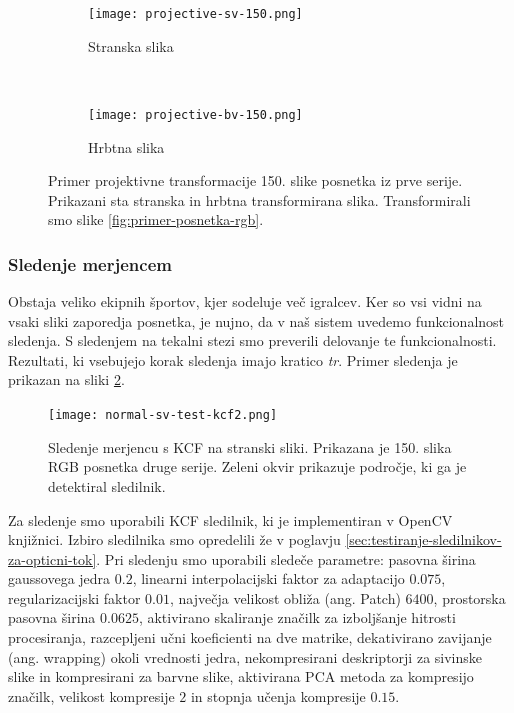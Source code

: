 \begin{figure}[!htb]
	\centering
	\begin{subfigure}[t]{0.45\columnwidth}
		\centering
		\texttt{[image: projective-sv-150.png]}
		\caption{Stranska slika}
	\end{subfigure}
	~
	\begin{subfigure}[t]{0.45\columnwidth}
		\centering
		\texttt{[image: projective-bv-150.png]}
		\caption{Hrbtna slika}
	\end{subfigure}
	\caption[Primer projektivne transformacije 150. slike posnetka iz prve serije]{Primer projektivne transformacije 150. slike posnetka iz prve serije. Prikazani sta stranska in hrbtna transformirana slika. Transformirali smo slike \ref{fig:primer-posnetka-rgb}.}
	\label{fig:projective}
\end{figure}


\subsubsection{Sledenje merjencem}\label{sec:tracking}
Obstaja veliko ekipnih športov, kjer sodeluje več igralcev. Ker so vsi vidni na vsaki sliki zaporedja posnetka, je nujno, da v naš sistem uvedemo funkcionalnost sledenja. S sledenjem na tekalni stezi smo preverili delovanje te funkcionalnosti. Rezultati, ki vsebujejo korak sledenja imajo kratico \textit{tr}. Primer sledenja je prikazan na sliki \ref{fig:sledenje}.

\begin{figure}[!htb]
	\centering
	\texttt{[image: normal-sv-test-kcf2.png]}
	\caption[Sledenje merjencu s KCF na stranski sliki.]{Sledenje merjencu s KCF na stranski sliki. Prikazana je 150. slika RGB posnetka druge serije. Zeleni okvir prikazuje področje, ki ga je detektiral sledilnik.}
	\label{fig:sledenje}
\end{figure} 

Za sledenje smo uporabili KCF sledilnik, ki je implementiran v OpenCV knjižnici. Izbiro sledilnika smo opredelili že v poglavju \ref{sec:testiranje-sledilnikov-za-opticni-tok}. Pri sledenju smo uporabili sledeče parametre: pasovna širina gaussovega jedra $0.2$, linearni interpolacijski faktor za adaptacijo $0.075$, regularizacijski faktor $0.01$, največja velikost obliža (ang. Patch) $6400$, prostorska pasovna širina $0.0625$, aktivirano skaliranje značilk za izboljšanje hitrosti procesiranja, razcepljeni učni koeficienti na dve matrike, dekativirano zavijanje (ang. wrapping) okoli vrednosti jedra, nekompresirani deskriptorji za sivinske slike in kompresirani za barvne slike, aktivirana PCA metoda za kompresijo značilk, velikost kompresije $2$ in  stopnja učenja kompresije $0.15$.

